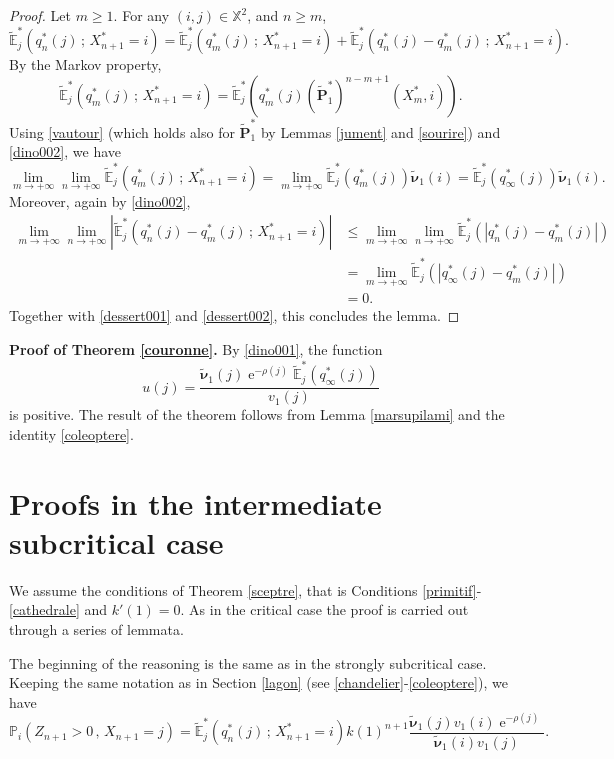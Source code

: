 \documentclass[12pt]{amsart}
\theoremstyle{definition}
\numberwithin{equation}{section}
\newcommand*{\abs}[1]{\left\lvert#1\right\rvert}
\def\bb#1{\mathbb{#1}}
\def\tbf#1{\tilde{\mathbf{#1}}}
\def\tbs#1{\tilde{\boldsymbol{#1}}}
\def\tbb#1{\tilde{\mathbb{#1}}}
\def\geq{\geqslant}
\def\leq{\leqslant}
\DeclareMathOperator{\e}{e}
\begin{document}
\begin{proof}
Let $m \geq 1$. For any $(i,j) \in \bb X^2$, and $n \geq m$,
\begin{equation}
\label{dessert001}
\tbb E_j^* \left( q_n^*(j) \,;\, X_{n+1}^* = i \right) = \tbb E_j^* \left( q_m^*(j) \,;\, X_{n+1}^* = i \right) + \tbb E_j^* \left( q_n^*(j) - q_m^*(j) \,;\, X_{n+1}^* = i \right).
\end{equation}
By the Markov property,
\[
\tbb E_j^* \left( q_m^*(j) \,;\, X_{n+1}^* = i \right) = \tbb E_j^* \left( q_m^*(j) \left(\tbf P_1^*\right)^{n-m+1} \left( X_m^*, i \right) \right).
\]
Using \eqref{vautour} (which holds also for $\tbf P_1^*$ by Lemmas \ref{jument} and \ref{sourire})
and \eqref{dino002}, we have
\begin{equation}
\label{dessert002}
\lim_{m\to +\infty} \lim_{n\to +\infty} \tbb E_j^* \left( q_m^*(j) \,;\, X_{n+1}^* = i \right) = \lim_{m\to +\infty}\tbb E_j^* \left( q_m^*(j) \right) \tbs \nu_1(i) = \tbb E_j^* \left( q_{\infty}^*(j) \right) \tbs \nu_1(i).
\end{equation}
Moreover, again by \eqref{dino002},
\begin{align*}
\lim_{m\to +\infty}\lim_{n\to +\infty} \abs{\tbb E_j^* \left( q_n^*(j) - q_m^*(j) \,;\, X_{n+1}^* = i \right)} &\leq \lim_{m\to +\infty}\lim_{n\to +\infty} \tbb E_j^* \left( \abs{q_n^*(j) - q_m^*(j)} \right) \\
&= \lim_{m\to +\infty} \tbb E_j^* \left( \abs{q_{\infty}^*(j) - q_m^*(j)} \right) \\
&= 0.
\end{align*}
Together with \eqref{dessert001} and \eqref{dessert002}, this concludes the lemma.
\end{proof}

\textbf{Proof of Theorem \ref{couronne}.} By \eqref{dino001}, the function 
\[
u(j) = \frac{\tbs \nu_1(j) \e^{-\rho(j)} \tbb E_j^* \left( q_{\infty}^*(j) \right)}{v_1(j)}
\]
is positive.
The result of the theorem follows from Lemma \ref{marsupilami} and the identity \eqref{coleoptere}.


\section{Proofs in the intermediate subcritical case}
\label{intermedcrit}
We assume the conditions of Theorem \ref{sceptre}, that is Conditions \ref{primitif}-\ref{cathedrale} and $k'(1)=0$. As in the critical case the proof is  carried out through a series of lemmata.

The beginning of the reasoning is the same as in the strongly subcritical case. Keeping the same notation as in Section \ref{lagon} (see \eqref{chandelier}-\eqref{coleoptere}), we have
\begin{equation}
\label{coleopterebis}
\bb P_i \left( Z_{n+1} > 0 \,,\, X_{n+1} = j \right) = \tbb E_j^* \left( q_n^*(j) \,;\, X_{n+1}^* = i \right) k(1)^{n+1} \frac{\tbs \nu_1(j) v_1(i) \e^{-\rho(j)}}{\tbs \nu_1(i) v_1(j)}.
\end{equation}
\end{document}

